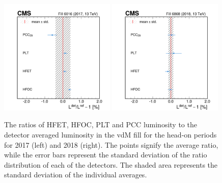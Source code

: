 \begin{figure}[!ht]
\centering
  \includegraphics[width=0.49\textwidth]{figures/visible_cross_section_results/lumi_sum5_histMean_fill6016_HFOC-HFET-PLT-PCCHD5div_HFET+HFOC+PLT+PCCHD5_ratioTrue_nls10_Xsecleg317.pdf}
  \includegraphics[width=0.49\textwidth]{figures/visible_cross_section_results/lumi_sum5_histMean_fill6868_HFOC-HFET-PLT-PCCHD5div_HFOC+HFET+PLT+PCCHD5_ratioTrue_nls2_Xsecleg318.pdf}
 \caption[Luminosity Ratios to Detector Average – vdM Head-On Periods (2017 & 2018)]{The ratios of HFET, HFOC, PLT and PCC luminosity to the detector averaged luminosity in the vdM fill for the head-on periods for 2017 (left) and 2018 (right). The points signify the average ratio, while the error bars represent the standard deviation of the ratio distribution of each of the detectors. The shaded area represents the standard deviation of the individual averages.}
\label{fig:vdM_xdet2}
\end{figure}










